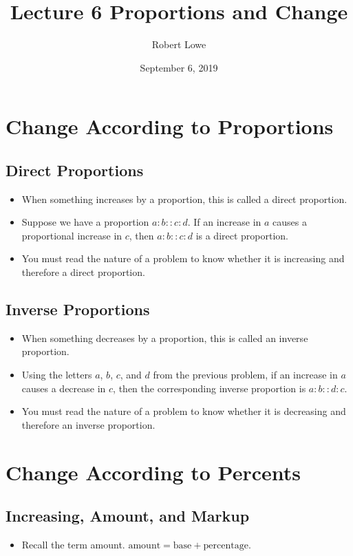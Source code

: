 \documentclass{article}
\title{Lecture 6 Proportions and Change}
\author{Robert Lowe}
\date{September 6, 2019}
\begin{document}
\maketitle

\section*{Change According to Proportions}
\subsection*{Direct Proportions}
\begin{itemize}
\item When something increases by a proportion, this is called a direct proportion.
\item Suppose we have a proportion $a:b :: c:d$.  If an increase in $a$ causes a proportional increase in $c$, then $a:b :: c:d$ is a direct proportion.  
\item You must read the nature of a problem to know whether it is increasing and therefore a direct proportion.
\end{itemize}

\subsection*{Inverse Proportions}
\begin{itemize}
\item When something decreases by a proportion, this is called an inverse proportion.
\item Using the letters $a$, $b$, $c$, and $d$ from the previous problem, if an increase in $a$ causes a decrease in $c$, then the corresponding inverse proportion is $a:b :: d:c$.
\item You must read the nature of a problem to know whether it is decreasing and therefore an inverse proportion.
\end{itemize}

\section*{Change According to Percents}
\subsection*{Increasing, Amount, and Markup}
\begin{itemize}
\item Recall the term amount.  $\mathrm{amount} = \mathrm{base} + \mathrm{percentage}$.
\end{itemize}
\end{document}
